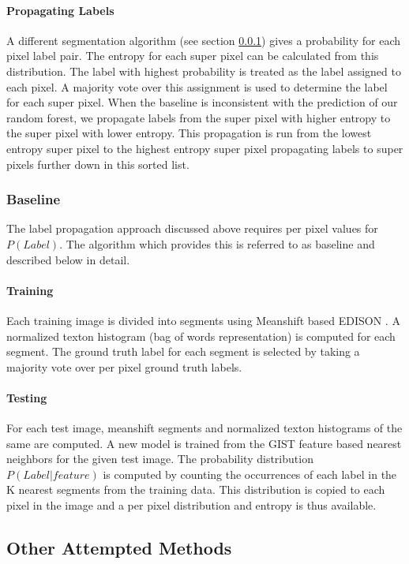 \documentclass{article} %
\begin{document}
\paragraph{Propagating Labels}
A different segmentation algorithm (see section \ref{baseline}) gives a
probability for each pixel label pair.
The entropy for each super pixel can be calculated from this distribution.
The label with highest probability is treated as the label assigned to
each pixel.
A majority vote over this assignment is used to determine the label for
each super pixel.
When the baseline is inconsistent with the prediction of our random
forest, we propagate labels from the super pixel with higher entropy to
the super pixel with lower entropy.
This propagation is run from the lowest entropy super pixel to the highest
entropy super pixel propagating labels to super pixels further down in
this sorted list.

\subsubsection{Baseline}
\label{baseline}
The label propagation approach discussed above requires per pixel values
for $P(Label)$.
The algorithm which provides this is referred to as baseline and described
below in detail.

\paragraph{Training} Each training image is divided into segments using
Meanshift based EDISON \cite{meanshift}.
A normalized texton histogram (bag of words representation) is computed for each segment.
The ground truth label for each segment is selected by taking a majority vote over per pixel ground truth labels.

\paragraph{Testing} For each test image, meanshift segments and normalized texton histograms of the same are computed.
A new model is trained from the GIST feature based nearest neighbors for the given test image.
The probability distribution $P(Label | feature)$ is computed by counting the occurrences of each label in the K nearest segments from the training data.
This distribution is copied to each pixel in the image and a per pixel distribution and entropy is thus available.

\subsection{Other Attempted Methods}
\end{document}
